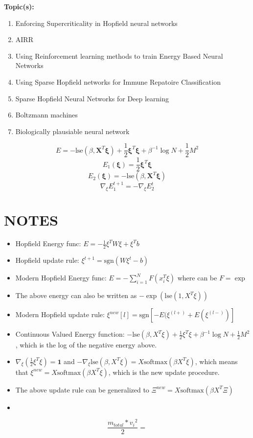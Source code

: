 \documentclass[letterpaper, 12pt]{article}
\begin{document}
\textbf{Topic(s):}
\begin{enumerate}
    \item Enforcing Supercriticality in Hopfield neural networks
    \item AIRR 
    \item Using Reinforcement learning methods to train Energy Based Neural Networks
    \item Using Sparse Hopfield networks for Immune Repatoire Classification
    \item Sparse Hopfield Neural Networks for Deep learning
    \item Boltzmann machines
    \item Biologically plausiable neural network
\end{enumerate}

\[E = -\text{lse}(\beta,\bm{X}^T\bm{\xi})+\frac 1 2 \bm{\xi}^T\bm{\xi} + \beta^{-1}\log{N} + \frac 1 2 M^2\]
\[E_1(\bm{\xi}) = \frac 1 2 \bm{\xi}^T\bm{\xi}\]
\[E_2(\bm{\xi}) = -\text{lse}(\beta, \bm{X}^T\bm{\xi})\]
\[\nabla_\xi E_1^{t+1} = -\nabla_\xi E_2^{t}\]

\section*{NOTES}
\begin{itemize}
    \item Hopfield Energy func: $E = -\frac 1 2 \xi^TW\xi+\xi^Tb$
    \item Hopfield update rule: $\xi^{t+1}=\text{sgn}(W\xi^t-b)$
    \item Modern Hopfield Energy func: $E = -\sum_{i=1}^N F(x_i^T\xi)$ where can be $F = \exp$
    \item The above energy can also be written as $-\exp(\text{lse}(1,X^T\xi))$
    \item Modern Hopfield update rule: $\xi^{new}[l] = \text{sgn}[-E(\xi^{(l+)}+E(\xi^{(l-)})]$
    \item Continuous Valued Energy function: $-\text{lse}(\beta, X^T\xi) + \frac 1 2\xi^T\xi + \beta^{-1}\log{N} + \frac 1 2  M^2$, which is the log of the negative energy above.
    \item $\nabla_\xi(\frac 1 2 \xi^T\xi) = \bm{1}$ and $-\nabla_\xi\text{lse}(\beta,X^T\xi) = X\text{softmax}(\beta X^T\xi)$, which means that
    $\xi^{new} = X\text{softmax}(\beta X^T\xi)$, which is the new update procedure.
    \item The above update rule can be generalized to $\Xi^{new} = X\text{softmax}(\beta X^T\Xi)$
    \item 
\end{itemize}

\[\frac {m_{total}\ast {v_{i}}^2}{2} = \]
\end{document}
